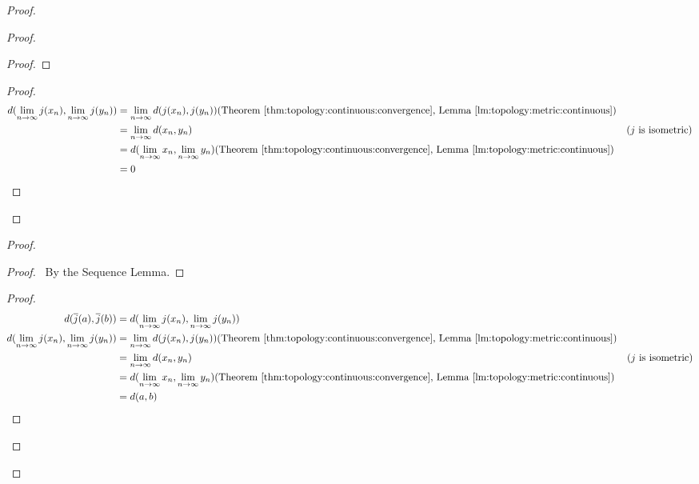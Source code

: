 \begin{proof}
\begin{proof}
\begin{proof}
    \end{proof}
    \begin{proof}
      \pf
      \begin{align*}
        d(\lim_{n \rightarrow \infty} j(x_n), \lim_{n \rightarrow \infty} j(y_n))
        & = \lim_{n \rightarrow \infty} d(j(x_n), j(y_n)) (\text{Theorem \ref{thm:topology:continuous:convergence}, Lemma \ref{lm:topology:metric:continuous}})\\
        & = \lim_{n \rightarrow \infty} d(x_n, y_n) & (j \text{ is isometric})\\
        & = d(\lim_{n \rightarrow \infty} x_n, \lim_{n \rightarrow \infty} y_n) (\text{Theorem \ref{thm:topology:continuous:convergence}, Lemma \ref{lm:topology:metric:continuous}}) \\
        & = 0
      \end{align*}
    \end{proof}
  \end{proof}
  \begin{proof}
    \begin{proof}
      \pf\ By the Sequence Lemma.
    \end{proof}
    \begin{proof}
      \pf
      \begin{align*}
        d(\overline{j}(a), \overline{j}(b))
        & = d(\lim_{n \rightarrow \infty} j(x_n), \lim_{n \rightarrow \infty} j(y_n)) \\
        d(\lim_{n \rightarrow \infty} j(x_n), \lim_{n \rightarrow \infty} j(y_n))
        & = \lim_{n \rightarrow \infty} d(j(x_n), j(y_n)) (\text{Theorem \ref{thm:topology:continuous:convergence}, Lemma \ref{lm:topology:metric:continuous}})\\
        & = \lim_{n \rightarrow \infty} d(x_n, y_n) & (j \text{ is isometric})\\
        & = d(\lim_{n \rightarrow \infty} x_n, \lim_{n \rightarrow \infty} y_n) (\text{Theorem \ref{thm:topology:continuous:convergence}, Lemma \ref{lm:topology:metric:continuous}}) \\
        & = d(a, b)
      \end{align*}

\end{proof}
\end{proof}
\end{proof}
